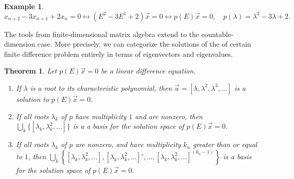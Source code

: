\documentclass[12pt,reqno]{amsart}
\numberwithin{equation}{section}  %
\newtheorem{theorem}{Theorem}[section]
\newtheorem{example}{Example}[section]
\begin{document}
\begin{example}
\begin{equation*}
x_{n+2} - 3x_{n+1} + 2x_{n} = 0 \longleftrightarrow (E^2 - 3E^1 + 2)\vec{x} = 0
\longleftrightarrow p(E) \vec{x} = 0, \quad p(\lambda) = \lambda^2 - 3 \lambda
+2.
\end{equation*}
\end{example}
The tools from finite-dimensional matrix algebra extend to the
countable-dimension case. More precisely, we can categorize the solutions of the
of certain finite difference problem entirely in terms of eigenvectors and
eigenvalues.
\begin{theorem}
\label{thm:dif-eq}
Let $p(E) \vec{x} = 0$ be a linear difference equation. 
\begin{enumerate}
  \item 
If $\lambda$ is a root
to its characteristic polynomial, then $\vec{u} = [\lambda, \lambda^2,
\lambda^3, \ldots]$ is a solution to $p(E) \vec{x} = 0$. 
  \item 
If all roots $\lambda_k$ of $p$ have multiplicity $1$ and are nonzero, then
$ \bigcup_k \{ [\lambda_k, \lambda_k^2, \ldots] \}$ is a 
a basis for the solution space of $p(E) \vec{x} = 0$.	
\item If all roots $\lambda_k$ of $p$ are nonzero, and have multiplicity $k_n$
greater than or equal to $1$, then $\bigcup_k \left\{ [\lambda_k, \lambda_k^2,
\ldots], [\lambda_k, \lambda_k^2, \ldots]', \ldots, [\lambda_k, \lambda_k^2,
\ldots ]^{(k_n -1)} \right\}$ is a basis for the solution space of $p(E)
\vec{x} = 0$.
\end{enumerate}
\end{theorem}
\end{document}
